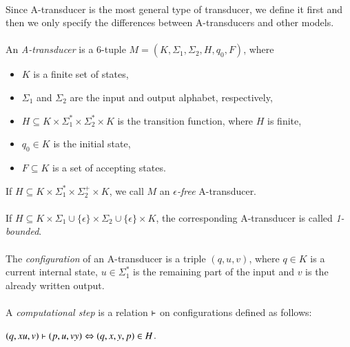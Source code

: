 \paragraph{}
Since A-transducer is the most general type of transducer, we define it first and then we only specify the differences between A-transducers and other models.

\paragraph{}
 An \emph{A-transducer} is a 6-tuple $M=(K, \Sigma_{1}, \Sigma_{2}, H, q_{0}, F)$, where
\begin{itemize}
\item $K$ is a finite set of states,
\item $\Sigma_{1} $ and $\Sigma_{2} $ are the input and output alphabet, respectively,
\item $H \subseteq K \times \Sigma_{1}^{*} \times \Sigma_{2}^{*} \times K$ is the transition function, where $H$ is finite,
\item $q_{0} \in K$ is the initial state,
\item $F \subseteq K$ is a set of accepting states.
\end{itemize}
If $H \subseteq K \times \Sigma_{1}^{*} \times \Sigma_{2}^{+} \times K$, we call $M$ an \emph{$\epsilon $-free} A-transducer.

\paragraph{}
 If $H \subseteq K \times \Sigma_{1} \cup \{ \epsilon \} \times \Sigma_{2} \cup \{ \epsilon \} \times K$, the corresponding A-transducer is called \emph{1-bounded}.

\paragraph{}
 The \emph{configuration} of an A-transducer is a triple $(q, u, v)$, where $q \in K$ is a current internal state, $u \in \Sigma_{1}^{*}$ is the remaining part of the input and $v$ is the already written output.

\paragraph{}
 A \emph{computational step} is a relation $\vdash$ on configurations defined as follows: \\
\centerline{$(q, xu, v) \vdash (p, u, vy) \Leftrightarrow (q, x, y, p) \in H$.}

